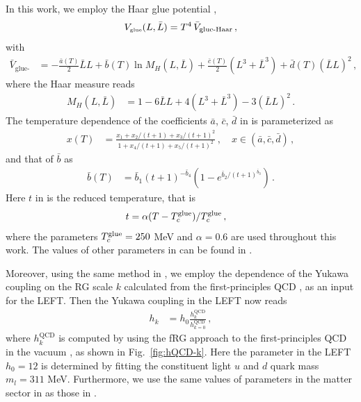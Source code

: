 \documentclass[aps,twocolumn,prd,superscriptaddress,nofootinbib,floatfix]{revtex4-2}
\begin{document}
In this work, we employ the Haar glue potential \cite{Lo:2013hla, Wen:2018nkn}, 
\begin{align}
    V_{\text{\tiny{glue}}}(L, \bar L)=T^4 \,\bar V_{\text{glue-Haar}}\,,\label{eq:Vglue}
\end{align}
with
\begin{align}
    \bar V_{\text{glue-Haar}} &= -\frac{\bar a(T)}{2} \bar L L + \bar b(T)\ln M_H(L,\bar{L})+ \frac{\bar c(T)}{2} (L^3+\bar L^3) + \bar d(T) (\bar{L} L)^2\,,\label{eq:GluepHaar}
\end{align}
where the Haar measure reads
\begin{align}
    M_H (L, \bar{L})&= 1 -6 \bar{L}L + 4 (L^3+\bar{L}^3) - 3  (\bar{L}L)^2\,.
\end{align}
The temperature dependence of the coefficients $\bar a$, $\bar c$, $\bar d$ in  is parameterized as
\begin{align}
    x(T) &= \frac{x_1 + x_2/(t+1) + x_3/(t+1)^2}{1 + x_4/(t+1) + x_5/(t+1)^2}\,,\quad x\in (\bar a, \bar c, \bar d)\,,\label{eq:xT}
\end{align}
and that of $\bar b$ as
\begin{align}
    \bar b(T) &=\bar b_1 (t+1)^{-\bar b_4}\left (1 -e^{\bar b_2/(t+1)^{\bar b_3}} \right)\,.\label{eq:bT}
\end{align}
Here $t$ in  is the reduced temperature, that is
\begin{align}
    t&=\alpha (T-T_c^\mathrm{\tiny{glue}})/T_c^\mathrm{\tiny{glue}}\,,\label{}
\end{align}
where the parameters $T_c^\mathrm{\tiny{glue}}=250$ MeV and $\alpha=0.6$ are used throughout this work. The values of other parameters in  can be found in \cite{Lo:2013hla, Wen:2018nkn}.

Moreover, using the same method in \cite{Fu:2023lcm}, we employ the dependence of the Yukawa coupling on the RG scale $k$ calculated from the first-principles QCD \cite{Fu:2019hdw}, as an input for the LEFT. Then the Yukawa coupling in the LEFT now reads
\begin{align}
    h_k&=h_0 \frac{h_{k}^{\mathrm{QCD}}}{h_{k=0}^{\mathrm{QCD}}}\,,\label{eq:hk}
\end{align}
where $h_{k}^{\mathrm{QCD}}$ is computed by using the fRG approach to the first-principles QCD in the vacuum \cite{Fu:2019hdw}, as shown in Fig.~\ref{fig:hQCD-k}. Here the parameter in the LEFT $h_0=12$ is determined by fitting the constituent light $u$ and $d$ quark mass $m_l=311$ MeV. Furthermore, we use the same values of parameters in the matter sector in  as those in \cite{Wen:2018nkn}.
\end{document}
